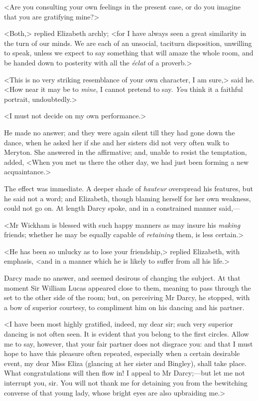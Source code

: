 <Are you consulting your own feelings in the present case, or do you imagine that you are gratifying mine?>

<Both,> replied Elizabeth archly; <for I have always seen a great similarity in the turn of our minds. We are each of an unsocial, taciturn disposition, unwilling to speak, unless we expect to say something that will amaze the whole room, and be handed down to posterity with all the \textit{éclat} of a proverb.>

<This is no very striking resemblance of your own character, I am sure,> said he. <How near it may be to \textit{mine}, I cannot pretend to say. \textit{You} think it a faithful portrait, undoubtedly.>

<I must not decide on my own performance.>

He made no answer; and they were again silent till they had gone down the dance, when he asked her if she and her sisters did not very often walk to Meryton. She answered in the affirmative; and, unable to resist the temptation, added, <When you met us there the other day, we had just been forming a new acquaintance.>

The effect was immediate. A deeper shade of \textit{hauteur} overspread his features, but he said not a word; and Elizabeth, though blaming herself for her own weakness, could not go on. At length Darcy spoke, and in a constrained manner said,—

<Mr Wickham is blessed with such happy manners as may insure his \textit{making} friends; whether he may be equally capable of \textit{retaining} them, is less certain.>

<He has been so unlucky as to lose your friendship,> replied Elizabeth, with emphasis, <and in a manner which he is likely to suffer from all his life.>

Darcy made no answer, and seemed desirous of changing the subject. At that moment Sir William Lucas appeared close to them, meaning to pass through the set to the other side of the room; but, on perceiving Mr Darcy, he stopped, with a bow of superior courtesy, to compliment him on his dancing and his partner.

<I have been most highly gratified, indeed, my dear sir; such very superior dancing is not often seen. It is evident that you belong to the first circles. Allow me to say, however, that your fair partner does not disgrace you: and that I must hope to have this pleasure often repeated, especially when a certain desirable event, my dear Miss Eliza (glancing at her sister and Bingley), shall take place. What congratulations will then flow in! I appeal to Mr Darcy;—but let me not interrupt you, sir. You will not thank me for detaining you from the bewitching converse of that young lady, whose bright eyes are also upbraiding me.>

